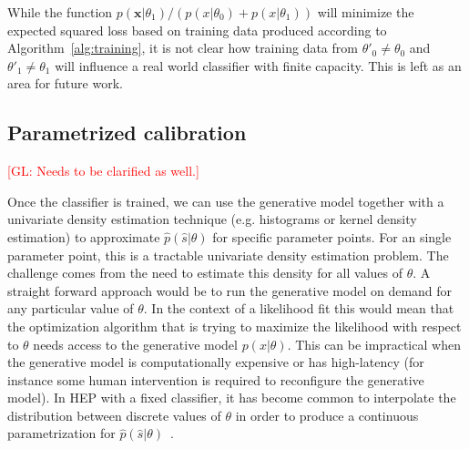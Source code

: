 \documentclass[12pt]{article}
\numberwithin{equation}{section}
\theoremstyle{plain}
\newcommand{\glnote}[1]{\textcolor{red}{[GL: #1]}}
\begin{document}

While the function $p(\mathbf{x}|\theta_1)/(p(x|\theta_0)+p(x|\theta_1))$ will minimize
the expected squared loss based on training data produced according to
Algorithm~\ref{alg:training}, it is not clear how training data from $\theta'_0
\ne \theta_0$ and $\theta'_1 \ne \theta_1$ will influence a real world
classifier with finite capacity. This is left as an area for future work.

\subsection{Parametrized calibration}

\glnote{Needs to be clarified as well.}

Once the classifier is trained, we can use the generative model together with a
univariate density estimation technique (e.g. histograms or kernel density
estimation) to approximate $\hat{p}(\hat{s}|\theta)$ for specific parameter
points. For an single parameter point, this is a tractable univariate density
estimation problem. The challenge comes from the need to estimate this density
for all values of $\theta$. A straight forward approach would be to run the
generative model on demand for any particular value of $\theta$. In the context
of a likelihood fit this would mean that the optimization algorithm that is
trying to maximize the likelihood with respect to $\theta$ needs access to the
generative model $p(x|\theta)$. This can be  impractical when the generative
model is computationally expensive or has high-latency (for instance some human
intervention is required to reconfigure the generative model).  In  HEP with a
fixed classifier, it has become common  to interpolate the distribution between
discrete values of $\theta$ in order to produce a continuous parametrization for
$\hat p(\hat s | \theta)$~\citep{Cranmer:2012sba}.
\end{document}
